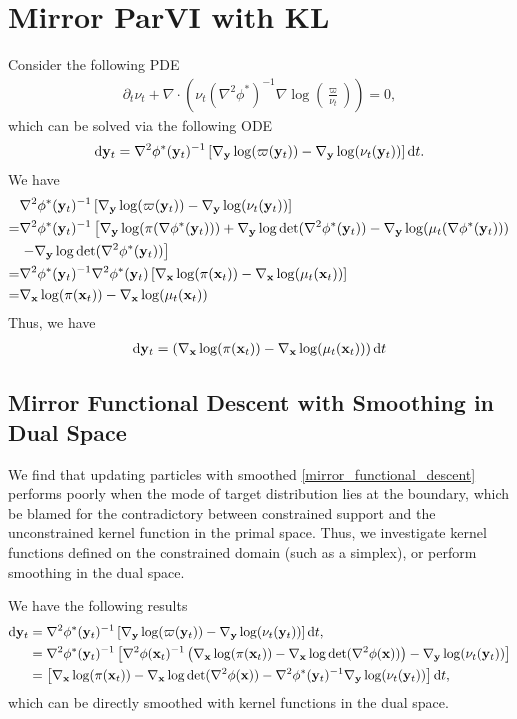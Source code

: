 \section{Mirror ParVI with KL}
Consider the following PDE
\begin{align}
	\partial_t \nu_t + \nabla\cdot (\nu_t (\nabla^2\phi^*)^{-1} \nabla\log(\frac{\varpi}{\nu_t})) = 0, 
\end{align}
which can be solved via the following ODE
\begin{align}
	\mathrm{d} \mathbf{y}_t = \nabla^2\phi^*(\mathbf{y}_t)^{-1}\left[\nabla_{\mathbf{y}}\log(\varpi(\mathbf{y}_t)) - \nabla_{\mathbf{y}}\log(\nu_t(\mathbf{y}_t))\right]\mathrm{d} t.
\end{align}
We have 
\begin{align*}
	&\nabla^2\phi^*(\mathbf{y}_t)^{-1}\left[\nabla_{\mathbf{y}}\log(\varpi(\mathbf{y}_t)) - \nabla_{\mathbf{y}}\log(\nu_t(\mathbf{y}_t))\right] \\ 
	= & \nabla^2\phi^*(\mathbf{y}_t)^{-1}\left[\nabla_{\mathbf{y}}\log(\pi(\nabla\phi^*(\mathbf{y}_t))) + \nabla_{\mathbf{y}}\log\det(\nabla^2\phi^*(\mathbf{y}_t)) - \nabla_{\mathbf{y}}\log(\mu_t(\nabla\phi^*(\mathbf{y}_t)))\right. \\ & \left. - \nabla_{\mathbf{y}}\log\det(\nabla^2\phi^*(\mathbf{y}_t))\right] \\ 
	= & \nabla^2\phi^*(\mathbf{y}_t)^{-1}\nabla^2\phi^*(\mathbf{y}_t)\left[\nabla_{\mathbf{x}}\log(\pi(\mathbf{x}_t)) - \nabla_{\mathbf{x}}\log(\mu_t(\mathbf{x}_t))\right]\\
	= & \nabla_{\mathbf{x}}\log(\pi(\mathbf{x}_t)) - \nabla_{\mathbf{x}}\log(\mu_t(\mathbf{x}_t))
\end{align*}
Thus, we have 
\begin{align}\label{mirror_functional_descent}
	\mathrm{d} \mathbf{y}_t = \left(\nabla_{\mathbf{x}}\log(\pi(\mathbf{x}_t)) - \nabla_{\mathbf{x}}\log(\mu_t(\mathbf{x}_t))\right)\mathrm{d} t
\end{align}

\subsection{Mirror Functional Descent with Smoothing in Dual Space}
We find that updating particles with smoothed \eqref{mirror_functional_descent} performs poorly when the mode of target distribution lies at the boundary, which be blamed for the contradictory between constrained support and the unconstrained kernel function in the primal space. 
Thus, we investigate kernel functions defined on the constrained domain (such as a simplex), or perform smoothing in the dual space.

We have the following results
\begin{align*}
	\mathrm{d} \mathbf{y}_t  & = \nabla^2\phi^*(\mathbf{y}_t)^{-1}\left[\nabla_{\mathbf{y}}\log(\varpi(\mathbf{y}_t)) - \nabla_{\mathbf{y}}\log(\nu_t(\mathbf{y}_t))\right]\mathrm{d} t, \\
    & = \nabla^2\phi^*(\mathbf{y}_t)^{-1}\left[\nabla^2\phi(\mathbf{x}_t)^{-1}\left(
        \nabla_{\mathbf{x}}\log(\pi(\mathbf{x}_t)) - \nabla_{\mathbf{x}}\log\det(\nabla^2\phi(\mathbf{x}))\right) - \nabla_{\mathbf{y}}\log(\nu_t(\mathbf{y}_t))\right] \\ 
    & = \left[\nabla_{\mathbf{x}}\log(\pi(\mathbf{x}_t)) - \nabla_{\mathbf{x}}\log\det(\nabla^2\phi(\mathbf{x})) - \nabla^2\phi^*(\mathbf{y}_t)^{-1}\nabla_{\mathbf{y}}\log(\nu_t(\mathbf{y}_t)) 
	\right]\mathrm{d} t, 
\end{align*}
which can be directly smoothed with kernel functions in the dual space.